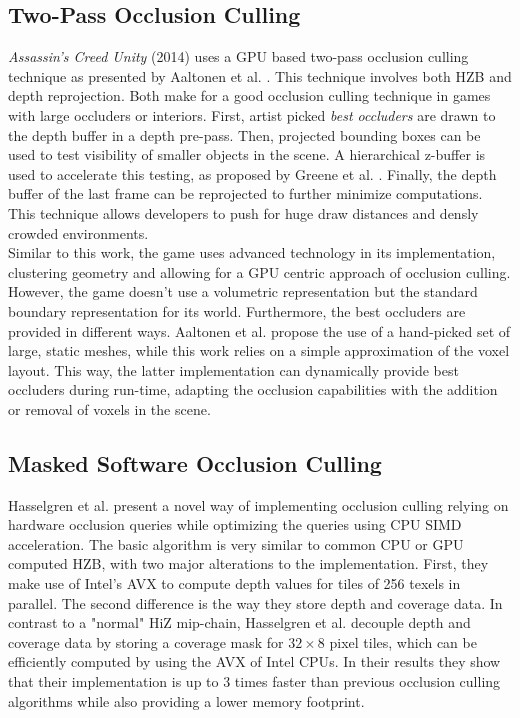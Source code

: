 \subsection*{Two-Pass Occlusion Culling}

\noindent
\emph{Assassin's Creed Unity} (2014) uses a \ac{GPU} based two-pass occlusion culling technique as presented by 
Aaltonen et al. \cite{Aaltonen2015}. This technique involves both \ac{HZB} and depth reprojection. Both make for 
a good occlusion culling technique in games with large occluders or interiors. First, artist picked 
\emph{best occluders} are drawn to the depth buffer in a depth pre-pass. Then, projected bounding boxes can be 
used to test visibility of smaller objects in the scene. A hierarchical z-buffer is used to accelerate this testing,
as proposed by Greene et al. \cite{Greene93,Greene95}. Finally, the depth buffer of the last frame can be 
reprojected to further minimize computations. This technique allows developers to push for huge draw distances and 
densly crowded environments.\\

\noindent
Similar to this work, the game uses advanced technology in its implementation, clustering geometry and allowing 
for a \ac{GPU} centric approach of occlusion culling. However, the game doesn't use a volumetric representation 
but the standard boundary representation for its world. Furthermore, the best occluders are provided in different 
ways. Aaltonen et al. \cite{Aaltonen2015} propose the use of a hand-picked set of large, static meshes, while this 
work relies on a simple approximation of the voxel layout. This way, the latter implementation can dynamically 
provide best occluders during run-time, adapting the occlusion capabilities with the addition or removal of voxels 
in the scene.


\subsection*{Masked Software Occlusion Culling}

Hasselgren et al. \cite{Hasselgren2016} present a novel way of implementing occlusion culling relying on hardware 
occlusion queries while optimizing the queries using \ac{CPU} \ac{SIMD} acceleration. The basic algorithm is very 
similar to common \ac{CPU} or \ac{GPU} computed \ac{HZB}, with two major alterations to the implementation. First, 
they make use of Intel's \ac{AVX} to compute depth values for tiles of 256 texels in parallel. The second difference 
is the way they store depth and coverage data. In contrast to a "normal" \ac{HiZ} mip-chain, Hasselgren et al. 
decouple depth and coverage data by storing a coverage mask for \begin{math}32 \times 8\end{math} pixel tiles, 
which can be efficiently computed by using the \ac{AVX} of Intel \ac{CPU}s. In their results they show that their 
implementation is up to 3 times faster than previous occlusion culling algorithms while also providing a lower 
memory footprint. \\

